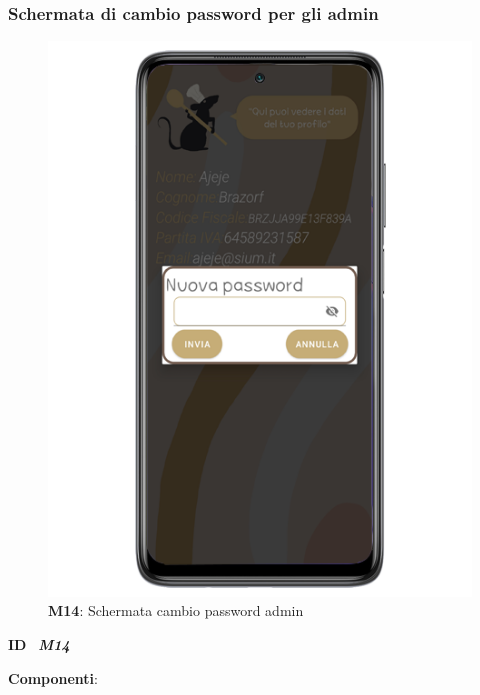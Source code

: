               \newpage

              \subsubsection{Schermata di cambio password per gli admin}
                \begin{figure}[H]
                  \centering
                  \includegraphics[scale=2.5]{assets/Mockup/Mockup_AdminChangePass.png}
                  \caption*{\textbf{M14}: Schermata cambio password admin}\label{fig:Mockup_AdminChangePass}
                \end{figure}
      
                \begin{flushleft}
                  \textbf{ID}   \ \Large{\textit{\textbf{M14}}}
                \end{flushleft}
      
                \textbf{Componenti}:
                
